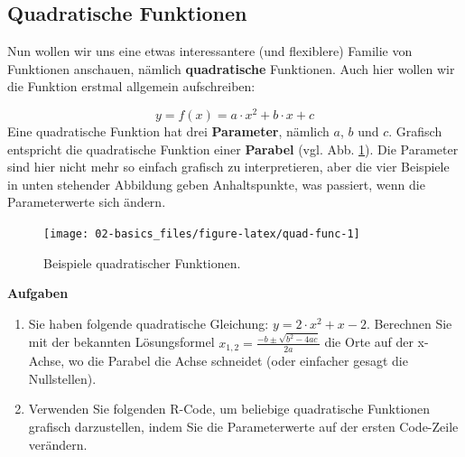 \documentclass[
]{book}
\providecommand{\tightlist}{%
  \setlength{\itemsep}{0pt}\setlength{\parskip}{0pt}}
\begin{document}
\hypertarget{quadratische-funktionen}{%
\subsection{Quadratische Funktionen}\label{quadratische-funktionen}}

Nun wollen wir uns eine etwas interessantere (und flexiblere) Familie von Funktionen anschauen, nämlich \textbf{quadratische} Funktionen. Auch hier wollen wir die Funktion erstmal allgemein aufschreiben:

\[
y = f(x) = a \cdot x^2 + b \cdot x + c
\]
Eine quadratische Funktion hat drei \textbf{Parameter}, nämlich \(a\), \(b\) und \(c\). Grafisch entspricht die quadratische Funktion einer \textbf{Parabel} (vgl. Abb. \ref{fig:quad-func}). Die Parameter sind hier nicht mehr so einfach grafisch zu interpretieren, aber die vier Beispiele in unten stehender Abbildung geben Anhaltspunkte, was passiert, wenn die Parameterwerte sich ändern.

\begin{figure}

{\centering \texttt{[image: 02-basics\_files/figure-latex/quad-func-1]} 

}

\caption{Beispiele quadratischer Funktionen.}\label{fig:quad-func}
\end{figure}

\textbf{Aufgaben}

\begin{enumerate}
\def\labelenumi{\arabic{enumi}.}
\tightlist
\item
  Sie haben folgende quadratische Gleichung: \(y = 2 \cdot x^2 + x - 2\). Berechnen Sie mit der bekannten Lösungsformel \(x_{1,2}=\frac{-b \pm \sqrt{b^2 - 4ac}}{2a}\) die Orte auf der x-Achse, wo die Parabel die Achse schneidet (oder einfacher gesagt die Nullstellen).
\item
  Verwenden Sie folgenden R-Code, um beliebige quadratische Funktionen grafisch darzustellen, indem Sie die Parameterwerte auf der ersten Code-Zeile verändern.
\end{enumerate}
\end{document}
